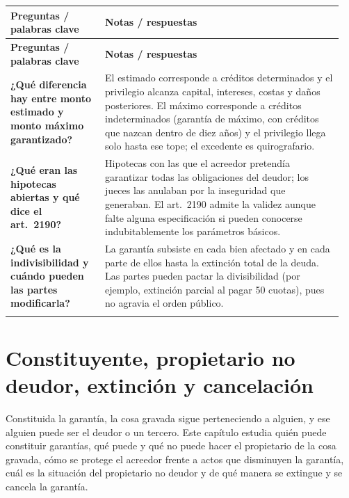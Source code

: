 \documentclass[12pt,oneside]{book}
\makeatletter
\newenvironment{cornell}{%
    \par\vspace{0.5em}
    \noindent
    \begin{longtable}{@{}>{\raggedright\arraybackslash}p{0.27\linewidth}
                         >{\raggedright\arraybackslash}p{0.68\linewidth}@{}}
    \toprule
    \textbf{Preguntas / palabras clave} & \textbf{Notas / respuestas} \\
    \midrule
    \endfirsthead
    \toprule
    \textbf{Preguntas / palabras clave} & \textbf{Notas / respuestas} \\
    \midrule
    \endhead
}{%
    \bottomrule
    \end{longtable}
}
\newcommand{\cornellsummary}[1]{%
    \midrule
    \multicolumn{2}{@{}p{\dimexpr0.95\linewidth+2\tabcolsep\relax}@{}}{%
        \vspace{0.2em}\textbf{Resumen:} #1\vspace{0.2em}} \\
}
\makeatother
\begin{document}
\begin{cornell}
\textbf{¿Qué diferencia hay entre monto estimado y monto máximo garantizado?} &
El estimado corresponde a créditos determinados y el privilegio alcanza capital, intereses, costas y daños posteriores. El máximo corresponde a créditos indeterminados (garantía de máximo, con créditos que nazcan dentro de diez años) y el privilegio llega solo hasta ese tope; el excedente es quirografario. \\

\textbf{¿Qué eran las hipotecas abiertas y qué dice el art.~2190?} &
Hipotecas con las que el acreedor pretendía garantizar todas las obligaciones del deudor; los jueces las anulaban por la inseguridad que generaban. El art.~2190 admite la validez aunque falte alguna especificación si pueden conocerse indubitablemente los parámetros básicos. \\

\textbf{¿Qué es la indivisibilidad y cuándo pueden las partes modificarla?} &
La garantía subsiste en cada bien afectado y en cada parte de ellos hasta la extinción total de la deuda. Las partes pueden pactar la divisibilidad (por ejemplo, extinción parcial al pagar 50 cuotas), pues no agravia el orden público. \\

\cornellsummary{La hipoteca, la prenda y la anticresis comparten una parte general (arts.~2184 a 2204). Su validez exige convencionalidad, accesoriedad y especialidad objetiva y crediticia; la indivisibilidad se presenta como carácter natural modificable por pacto, aunque otra fuente la incluye entre los exigidos bajo pena de nulidad. La reforma del art.~2189 incorporó las garantías sobre créditos indeterminados, con privilegio acotado al monto máximo garantizado y créditos que nazcan dentro de los diez años.}
\end{cornell}

\chapter{Constituyente, propietario no deudor, extinción y cancelación}\label{cap:garantias-constituyente}

Constituida la garantía, la cosa gravada sigue perteneciendo a alguien, y ese alguien puede ser el deudor o un tercero. Este capítulo estudia quién puede constituir garantías, qué puede y qué no puede hacer el propietario de la cosa gravada, cómo se protege el acreedor frente a actos que disminuyen la garantía, cuál es la situación del propietario no deudor y de qué manera se extingue y se cancela la garantía.
\end{document}
